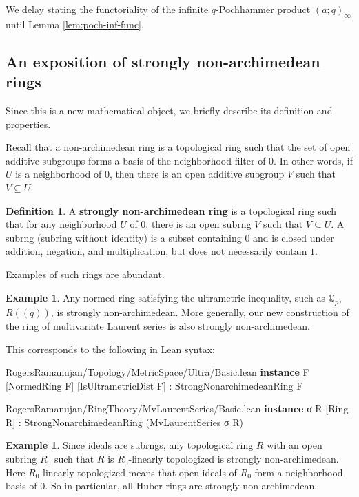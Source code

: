 \documentclass[12pt]{amsart}
\theoremstyle{definition}
\newtheorem{definition}[theorem]{Definition}
\newtheorem{example}[theorem]{Example}
\theoremstyle{remark}
\numberwithin{equation}{subsection}
\newcommand{\Q}{\mathbb Q}
\newcommand{\kw}[1]{\textcolor{keywordcolor}{\textbf{#1}}}
\newcommand{\var}[1]{\textcolor{tacticcolor}{#1}}
\newcommand{\imp}[1]{\textcolor{commentcolor}{\textbraceleft#1\textbraceright}}
\begin{document}
We delay stating the functoriality of the infinite $q$-Pochhammer product $(a; q)_\infty$ until Lemma \ref{lem:poch-inf-func}.

\subsection{An exposition of strongly non-archimedean rings}
\label{sec:strong}

Since this is a new mathematical object, we briefly describe its definition and properties.

Recall that a non-archimedean ring is a topological ring such that the set of open additive subgroups forms a basis of the neighborhood filter of $0$. In other words, if $U$ is a neighborhood of $0$, then there is an open additive subgroup $V$ such that $V \subseteq U$.

\begin{definition}
    A \textbf{strongly non-archimedean ring} is a topological ring such that for any neighborhood $U$ of $0$, there is an open subrng $V$ such that $V \subseteq U$. A subrng (subring without identity) is a subset containing $0$ and is closed under addition, negation, and multiplication, but does not necessarily contain $1$.
\end{definition}

Examples of such rings are abundant.
\begin{example}
Any normed ring satisfying the ultrametric inequality, such as $\Q_p$, $R(\!(q)\!)$, is strongly non-archimedean.
More generally, our new construction of the ring of multivariate Laurent series is also strongly non-archimedean.
\end{example}

This corresponds to the following in Lean syntax:
\begin{code}{RogersRamanujan/Topology/MetricSpace/Ultra/Basic.lean}
\kw{instance} \imp{F} [NormedRing \var{F}] [IsUltrametricDist \var{F}] : StrongNonarchimedeanRing \var{F}
\end{code}

\begin{code}{RogersRamanujan/RingTheory/MvLaurentSeries/Basic.lean}
\kw{instance} \imp{σ R} [Ring \var{R}] : StrongNonarchimedeanRing (MvLaurentSeries \var{σ} \var{R})
\end{code}

\begin{example}
Since ideals are subrngs, any topological ring $R$ with an open subring $R_0$ such that $R$ is $R_0$-linearly topologized is strongly non-archimedean. Here $R_0$-linearly topologized means that open ideals of $R_0$ form a neighborhood basis of $0$.
So in particular, all Huber rings are strongly non-archimedean.
\end{example}
\end{document}

